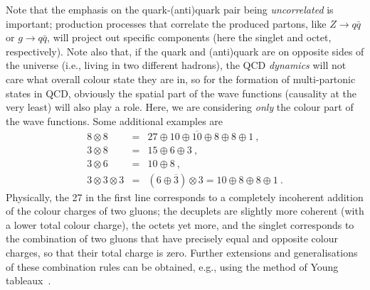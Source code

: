 Note that the emphasis on
the quark-(anti)quark pair being \emph{uncorrelated} is important;
production processes that correlate the produced partons, like $Z\to q\bar{q}$ or $g\to q\bar{q}$, will
project out specific components (here the singlet and octet,
respectively). 
Note also that, if the quark
and (anti)quark are on opposite sides of the universe (i.e., living in
two different hadrons), the QCD \emph{dynamics} will not care what
overall colour state they 
are in, so for the formation of multi-partonic states in QCD, obviously the
spatial part of the wave functions (causality at the very least) 
will also play a role. Here, we are considering \emph{only} the colour part
of the wave functions. 
Some additional examples are 
\begin{eqnarray}
8\otimes 8 & = & 27 \oplus 10 \oplus \overline{10} \oplus 8 \oplus 8
\oplus 1 ~,\\ 
3 \otimes 8 & = & 15 \oplus 6 \oplus 3~,\\
3 \otimes 6 & = & 10 \oplus 8~,\\
3\otimes3\otimes3 & = & (6 \oplus \overline{3}) \otimes 3 = 10 \oplus 8
\oplus 8 \oplus 1 ~.
\end{eqnarray}
Physically, the 27 in the first line corresponds to a completely
incoherent addition of the colour charges of two gluons;
the decuplets are slightly more coherent (with a lower
total colour charge), the octets
yet more, and the singlet corresponds to the combination of two gluons
that have precisely equal and opposite colour charges, so that their
total charge is zero. 
Further extensions and generalisations of these combination rules can
be obtained, e.g., using the method of Young
tableaux~\cite{young1901,youngSagan}.  

